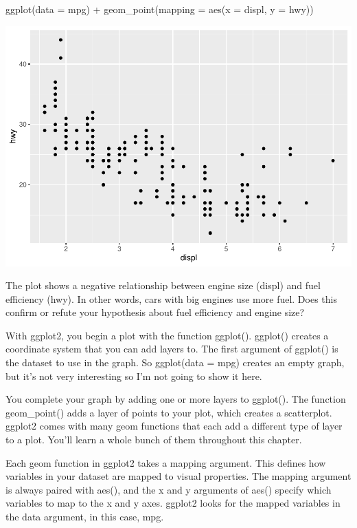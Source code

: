 \documentclass[
]{article}
\newenvironment{Shaded}{\begin{snugshade}}{\end{snugshade}}
\newcommand{\AttributeTok}[1]{\textcolor[rgb]{0.77,0.63,0.00}{#1}}
\newcommand{\FunctionTok}[1]{\textcolor[rgb]{0.00,0.00,0.00}{#1}}
\newcommand{\NormalTok}[1]{#1}
\newcommand{\SpecialCharTok}[1]{\textcolor[rgb]{0.00,0.00,0.00}{#1}}
\begin{document}
\begin{Shaded}
\begin{Highlighting}[]
\FunctionTok{ggplot}\NormalTok{(}\AttributeTok{data =}\NormalTok{ mpg) }\SpecialCharTok{+} 
  \FunctionTok{geom\_point}\NormalTok{(}\AttributeTok{mapping =} \FunctionTok{aes}\NormalTok{(}\AttributeTok{x =}\NormalTok{ displ, }\AttributeTok{y =}\NormalTok{ hwy))}
\end{Highlighting}
\end{Shaded}

\includegraphics{Journal_files/figure-latex/unnamed-chunk-43-1.pdf}

The plot shows a negative relationship between engine size (displ) and
fuel efficiency (hwy). In other words, cars with big engines use more
fuel. Does this confirm or refute your hypothesis about fuel efficiency
and engine size?

With ggplot2, you begin a plot with the function ggplot(). ggplot()
creates a coordinate system that you can add layers to. The first
argument of ggplot() is the dataset to use in the graph. So ggplot(data
= mpg) creates an empty graph, but it's not very interesting so I'm not
going to show it here.

You complete your graph by adding one or more layers to ggplot(). The
function geom\_point() adds a layer of points to your plot, which
creates a scatterplot. ggplot2 comes with many geom functions that each
add a different type of layer to a plot. You'll learn a whole bunch of
them throughout this chapter.

Each geom function in ggplot2 takes a mapping argument. This defines how
variables in your dataset are mapped to visual properties. The mapping
argument is always paired with aes(), and the x and y arguments of aes()
specify which variables to map to the x and y axes. ggplot2 looks for
the mapped variables in the data argument, in this case, mpg.
\end{document}
